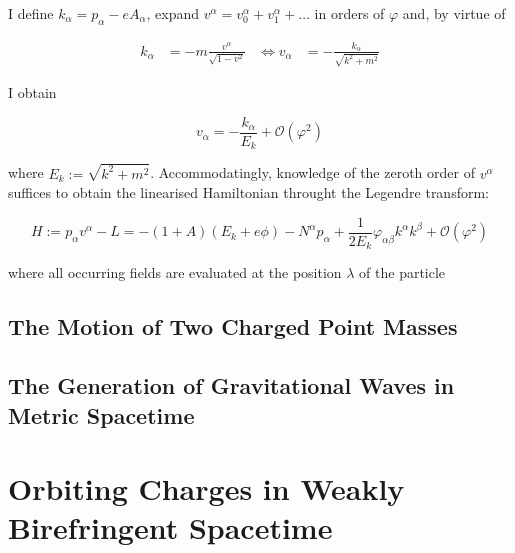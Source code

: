 \documentclass[11pt]{article}
\begin{document}
I define $k_\alpha = p_\alpha - e A_\alpha$, expand $v^\alpha = v^\alpha_0 + v^\alpha_1 + \dots $ in orders of $\varphi$ and, by virtue of

\begin{align}
	k_\alpha &= -m \frac{v^\alpha}{\sqrt{1- v^2}} 
	 &\Leftrightarrow 
	 v_\alpha &= - \frac{k_\alpha}{\sqrt{k^2 + m^2}} 
\end{align}

I obtain

\begin{equation}
	v_\alpha = - \frac{k_\alpha}{E_k} + \mathcal{O} \left(\varphi^2 \right)
\end{equation}

where $E_k := \sqrt{k^2+ m^2}$. Accommodatingly, knowledge of the zeroth order of $v^\alpha$ suffices to obtain the linearised Hamiltonian throught the Legendre transform:

\begin{equation}
	H := p_\alpha v^\alpha - L  
	= - \left( 1 + A \right) \left( E_k + e \phi \right)
	- N^\alpha p_\alpha + \frac{1}{2 E_k} \varphi_{\alpha \beta} k^\alpha k^\beta + \mathcal{O} \left(\varphi^2 \right)
\end{equation}

where all occurring fields are evaluated at the position $\lambda$ of the particle

\subsection{The Motion of Two Charged Point Masses}

\subsection{The Generation of Gravitational Waves in Metric Spacetime}

\section{Orbiting Charges in Weakly Birefringent Spacetime}
\end{document}
